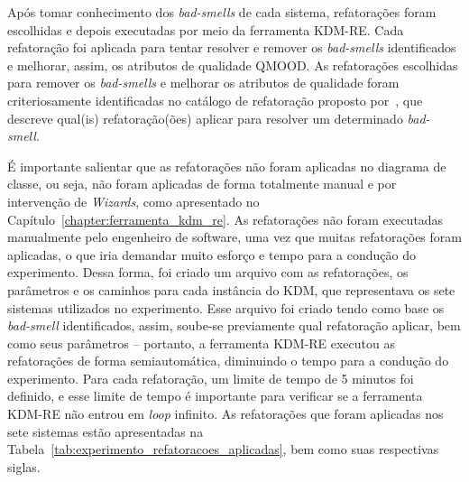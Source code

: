 Após tomar conhecimento dos \textit{bad-smells} de cada sistema, refatorações foram escolhidas e depois executadas por meio da ferramenta KDM-RE. Cada refatoração foi aplicada para tentar resolver e remover os \textit{bad-smells} identificados e melhorar, assim, os atributos de qualidade QMOOD. As refatorações escolhidas para remover os \textit{bad-smells} e melhorar os atributos de qualidade foram criteriosamente identificadas no catálogo de refatoração proposto por~, que descreve qual(is) refatoração(ões) aplicar para resolver um determinado \textit{bad-smell}. 

É importante salientar que as refatorações não foram aplicadas no diagrama de classe, ou seja, não foram aplicadas de forma totalmente manual e por intervenção de \textit{Wizards}, como apresentado no Capítulo~\ref{chapter:ferramenta_kdm_re}. As refatorações não foram executadas manualmente pelo engenheiro de software, uma vez que muitas refatorações foram aplicadas, o que iria demandar muito esforço e tempo para a condução do experimento. Dessa forma, foi criado um arquivo com as refatorações, os parâmetros e os caminhos para cada instância do KDM, que representava os sete sistemas utilizados no experimento. Esse arquivo foi criado tendo como base os \textit{bad-smell} identificados, assim, soube-se previamente qual refatoração aplicar, bem como seus parâmetros – portanto, a ferramenta KDM-RE executou as refatorações de forma semiautomática, diminuindo o tempo para a condução do experimento. Para cada refatoração, um limite de tempo de 5 minutos foi definido, e esse limite de tempo é importante para verificar se a ferramenta KDM-RE não entrou em \textit{loop} infinito.
As refatorações que foram aplicadas nos sete sistemas estão apresentadas na Tabela~\ref{tab:experimento_refatoracoes_aplicadas}, bem como suas respectivas siglas. 



